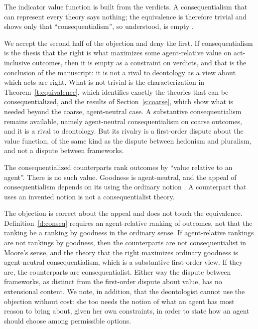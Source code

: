 \documentclass{situationist-preprint}
\begin{document}
\begin{objection}[Triviality]
The indicator value function is built from the verdicts. A consequentialism that can represent every theory says nothing; the equivalence is therefore trivial and shows only that ``consequentialism'', so understood, is empty \citep{Louise2004,Sachs2010}.
\end{objection}

\begin{reply}
We accept the second half of the objection and deny the first. If consequentialism is the thesis that the right is what maximizes some agent-relative value on act-inclusive outcomes, then it is empty as a constraint on verdicts, and that is the conclusion of the manuscript: it is not a rival to deontology as a view about which acts are right. What is not trivial is the characterization in Theorem~\ref{t:equivalence}, which identifies exactly the theories that can be consequentialized, and the results of Section~\ref{s:coarse}, which show what is needed beyond the coarse, agent-neutral case. A substantive consequentialism remains available, namely agent-neutral consequentialism on coarse outcomes, and it is a rival to deontology. But its rivalry is a first-order dispute about the value function, of the same kind as the dispute between hedonism and pluralism, and not a dispute between frameworks.
\end{reply}

\begin{objection}
The consequentialized counterparts rank outcomes by ``value relative to an agent''. There is no such value. Goodness is agent-neutral, and the appeal of consequentialism depends on its using the ordinary notion \citep{Schroeder2007}. A counterpart that uses an invented notion is not a consequentialist theory.
\end{objection}

\begin{reply}
The objection is correct about the appeal and does not touch the equivalence. Definition~\ref{d:conseq} requires an agent-relative ranking of outcomes, not that the ranking be a ranking by goodness in the ordinary sense. If agent-relative rankings are not rankings by goodness, then the counterparts are not consequentialist in Moore's sense, and the theory that the right maximizes ordinary goodness is agent-neutral consequentialism, which is a substantive first-order view. If they are, the counterparts are consequentialist. Either way the dispute between frameworks, as distinct from the first-order dispute about value, has no extensional content. We note, in addition, that the deontologist cannot use the objection without cost: she too needs the notion of what an agent has most reason to bring about, given her own constraints, in order to state how an agent should choose among permissible options.
\end{reply}
\end{document}
